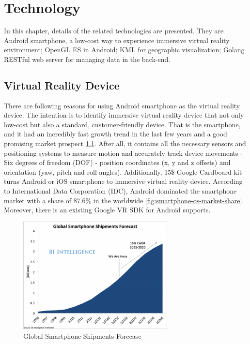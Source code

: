 \label{chapter-technology}
\chapter{Technology}

In this chapter, details of the related technologies are presented. They are Android smartphone, a low-cost way to experience immersive virtual reality environment; OpenGL ES in Android; KML for geographic visualization; Golang RESTful web server for managing data in the back-end.

\section{Virtual Reality Device}

There are following reasons for using Android smartphone as the virtual reality device. The intention is to identify immersive virtual reality device that not only low-cost but also a standard, customer-friendly device. That is the smartphone, and it had an incredibly fast growth trend in the last few years and a good promising market prospect \ref{fig:smartphone-shipments-forecast}. After all, it contains all the necessary sensors and positioning systems to measure motion and accurately track device movements - Six degrees of freedom (DOF) - position coordinates (x, y and z offsets) and orientation (yaw, pitch and roll angles). Additionally, 15\$ Google Cardboard kit turns Android or iOS smartphone to immersive virtual reality device. According to International Data Corporation (IDC), Android dominated the smartphone market with a share of 87.6\% in the worldwide \ref{fig:smartphone-os-market-share}. Moreover, there is an existing Google VR SDK \cite{google.vr-sdk.2016} for Android supports.

\begin{figure}[H]
\caption[Global Smartphone Shipments Forecase]{Global Smartphone Shipments Forecase \cite{tony.global-smartphone-market.2015}}
\label{fig:smartphone-shipments-forecast}
\centering
\includegraphics[width=0.7\textwidth, keepaspectratio]{Figures/smartphone-shipments-forecast.png}
\decoRule
\end{figure}

